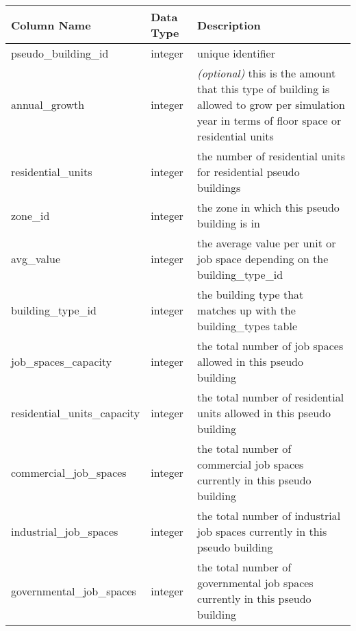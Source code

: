 \begin{tabular}{p{2.3in}lp{3.2in}}
\textbf{Column Name} & \textbf{Data Type} & \textbf{Description} \\
\hline
pseudo\_building\_id & integer & unique identifier\\ \hline
annual\_growth & integer & \emph{(optional)} this is the amount that this type of building is allowed to grow per simulation year in terms of floor space or residential units\\ \hline
residential\_units & integer & the number of residential units for residential pseudo buildings\\ \hline
zone\_id & integer & the zone in which this pseudo building is in\\ \hline
avg\_value & integer & the average value per unit or job space depending on the building\_type\_id\\ \hline
building\_type\_id & integer & the building type that matches up with the building\_types table\\ \hline
job\_spaces\_capacity & integer & the total number of job spaces allowed in this pseudo building\\ \hline
residential\_units\_capacity & integer & the total number of residential units allowed in this pseudo building\\ \hline
commercial\_job\_spaces & integer & the total number of commercial job spaces currently in this pseudo building\\ \hline
industrial\_job\_spaces & integer & the total number of industrial job spaces currently in this pseudo building\\ \hline
governmental\_job\_spaces & integer & the total number of governmental job spaces currently in this pseudo building\\ \hline
\end{tabular}